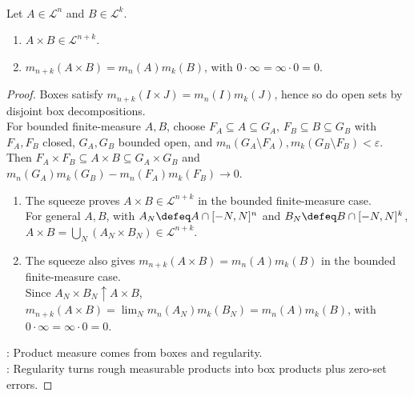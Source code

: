 \begin{theorem} \label{thm:measurable-products-product-measure} \\
Let $A\in\mathcal L^n$ and $B\in\mathcal L^k$.
\begin{enumerate}[label=(\roman*)]
\setlength{\itemsep}{0pt}
\item $A\times B\in\mathcal L^{n+k}$.
\item $m_{n+k}(A\times B)=m_n(A)m_k(B)$, with $0\cdot\infty=\infty\cdot0=0$.
\end{enumerate}
\begin{proof} Boxes satisfy $m_{n+k}(I\times J)=m_n(I)m_k(J)$, hence so do open sets by disjoint box decompositions.\\
For bounded finite-measure $A,B$, choose $F_A\subseteq A\subseteq G_A$, $F_B\subseteq B\subseteq G_B$ with $F_A,F_B$ closed, $G_A,G_B$ bounded open, and $m_n(G_A\setminus F_A),m_k(G_B\setminus F_B)<\varepsilon$.\\
Then $F_A\times F_B\subseteq A\times B\subseteq G_A\times G_B$ and $m_n(G_A)m_k(G_B)-m_n(F_A)m_k(F_B)\to0$.
\begin{enumerate}[label=(\roman*)]
\setlength{\itemsep}{0pt}
\item The squeeze proves $A\times B\in\mathcal L^{n+k}$ in the bounded finite-measure case.\\
For general $A,B$, with $A_N\defeq A\cap[-N,N]^n$ and $B_N\defeq B\cap[-N,N]^k$, $A\times B=\bigcup_N(A_N\times B_N)\in\mathcal L^{n+k}$.
\item The squeeze also gives $m_{n+k}(A\times B)=m_n(A)m_k(B)$ in the bounded finite-measure case.\\
Since $A_N\times B_N\uparrow A\times B$, $m_{n+k}(A\times B)=\lim_Nm_n(A_N)m_k(B_N)=m_n(A)m_k(B)$, with $0\cdot\infty=\infty\cdot0=0$.
\end{enumerate}
: Product measure comes from boxes and regularity.\\
: Regularity turns rough measurable products into box products plus zero-set errors.
\end{proof}
\end{theorem}

